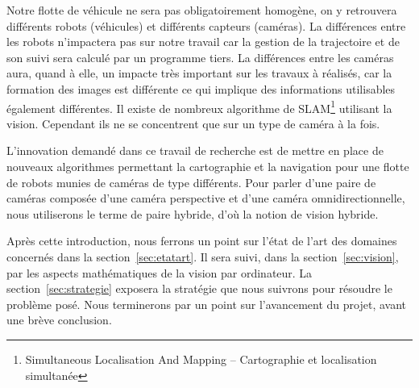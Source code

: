 
Notre flotte de véhicule ne sera pas obligatoirement homogène, on y retrouvera différents robots (véhicules) et différents capteurs (caméras).
La différences entre les robots n'impactera pas sur notre travail car la gestion de la trajectoire et de son suivi sera calculé par un programme tiers.
La différences entre les caméras aura, quand à elle, un impacte très important sur les travaux à réalisés, car la formation des images est différente ce qui implique des informations utilisables également différentes.
Il existe de nombreux algorithme de SLAM\footnote{Simultaneous Localisation And Mapping -- Cartographie et localisation simultanée} utilisant la vision.
Cependant ils ne se concentrent que sur un type de caméra à la fois.

L'innovation demandé dans ce travail de recherche est de mettre en place de nouveaux algorithmes permettant la cartographie et la navigation pour une flotte de robots munies de caméras de type différents.
Pour parler d'une paire de caméras composée d'une caméra perspective et d'une caméra omnidirectionnelle, nous utiliserons le terme de paire hybride, d'où la notion de vision hybride.

\vspace{5mm}
Après cette introduction, nous ferrons un point sur l'état de l'art des domaines concernés dans la section~\ref{sec:etatart}.
Il sera suivi, dans la section~\ref{sec:vision}, par les aspects mathématiques de la vision par ordinateur.
La section~\ref{sec:strategie} exposera la stratégie que nous suivrons pour résoudre le problème posé.
Nous terminerons par un point sur l'avancement du projet, avant une brève conclusion.
